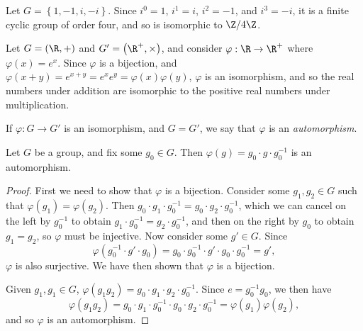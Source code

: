 \documentclass[12pt]{article}
\begin{document}
\begin{exmp}
    Let $G = \left\{1, -1, i, -i\right\}$. Since $i^0 = 1$, $i^1 = i$, $i^2 = -1$, and $i^3 = -i$, it is a finite cyclic group of order four, and so is isomorphic to $\Z/4\Z$.
\end{exmp}

\begin{exmp}
    Let $G = \left(\R, +\right)$ and $G' = \left(\R^+, \times\right)$, and consider $\varphi: \R \to \R^+$ where $\varphi(x) = e^x$. Since $\varphi$ is a bijection, and $\varphi(x + y) = e^{x+y} = e^xe^y = \varphi(x)\varphi(y)$, $\varphi$ is an isomorphism, and so the real numbers under addition are isomorphic to the positive real numbers under multiplication.
\end{exmp}

\begin{defn}
    If $\varphi: G \to G'$ is an isomorphism, and $G = G'$, we say that $\varphi$ is an \emph{automorphism}.
\end{defn}

\begin{prop}
    Let $G$ be a group, and fix some $g_0 \in G$. Then $\varphi(g) = g_0 \cdot g \cdot g_0^{-1}$ is an automorphism.
\end{prop}

\begin{proof}
    First we need to show that $\varphi$ is a bijection. Consider some $g_1, g_2 \in G$ such that $\varphi(g_1) = \varphi(g_2)$. Then $g_0 \cdot g_1 \cdot g_0^{-1} = g_0 \cdot g_2 \cdot g_0^{-1}$, which we can cancel on the left by $g_0^{-1}$ to obtain $g_1 \cdot g_0^{-1} = g_2 \cdot g_0^{-1}$, and then on the right by $g_0$ to obtain $g_1 = g_2$, so $\varphi$ must be injective. Now consider some $g' \in G$. Since \[\varphi(g_0^{-1} \cdot g' \cdot g_0) = g_0 \cdot g_0^{-1} \cdot g' \cdot g_0 \cdot g_0^{-1} = g',\] $\varphi$ is also surjective. We have then shown that $\varphi$ is a bijection.

    Given $g_1, g_1 \in G$, $\varphi(g_1g_2) = g_0 \cdot g_1 \cdot g_2 \cdot g_0^{-1}$. Since $e = g_0^{-1}g_0$, we then have
    \[\varphi(g_1g_2) = g_0 \cdot g_1 \cdot g_0^{-1} \cdot g_0 \cdot g_2 \cdot g_0^{-1} = \varphi(g_1)\varphi(g_2),\] and so $\varphi$ is an automorphism.
\end{proof}
\end{document}
